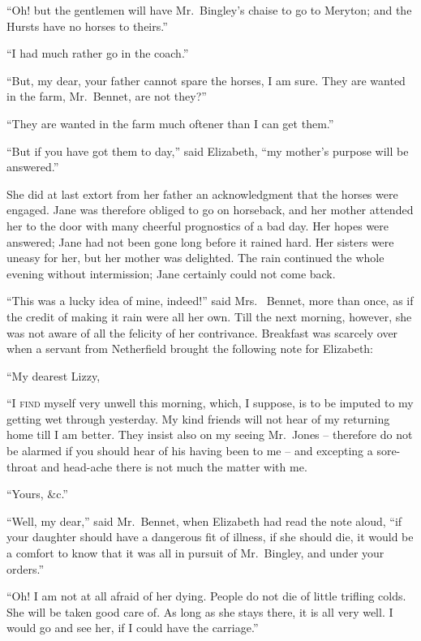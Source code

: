 “Oh! but the gentlemen will have Mr.\ Bingley’s chaise
to go to Meryton; and the Hursts have no horses to
theirs.”

“I had much rather go in the coach.”

“But, my dear, your father cannot spare the horses,
I am sure. They are wanted in the farm, Mr.\ Bennet,
are not they?”

“They are wanted in the farm much oftener than I can
get them.”

“But if you have got them to day,” said Elizabeth,
“my mother’s purpose will be answered.”

She did at last extort from her father an acknowledgment
that the horses were engaged. Jane was therefore
obliged to go on horseback, and her mother attended her
to the door with many cheerful prognostics of a bad day.
Her hopes were answered; Jane had not been gone long
before it rained hard. Her sisters were uneasy for her, but
her mother was delighted. The rain continued the whole
evening without intermission; Jane certainly could not
come back.

“This was a lucky idea of mine, indeed!” said Mrs.\ %
Bennet, more than once, as if the credit of making it rain
were all her own. Till the next morning, however, she
was not aware of all the felicity of her contrivance. Breakfast
was scarcely over when a servant from Netherfield
brought the following note for Elizabeth:

\begin{letter}
“My dearest Lizzy,

“I \textsc{find} myself very unwell this morning, which,
I suppose, is to be imputed to my getting wet through
yesterday. My kind friends will not hear of my returning
home till I am better. They insist also on my seeing
Mr.\ Jones -- therefore do not be alarmed if you should
hear of his having been to me -- and excepting a sore-%
throat and head-ache there is not much the matter with
me.

\raggedleft “Yours, \&c.”
\end{letter}

“Well, my dear,” said Mr.\ Bennet, when Elizabeth had
read the note aloud, “if your daughter should have a
dangerous fit of illness, if she should die, it would be
a comfort to know that it was all in pursuit of Mr.\ Bingley,
and under your orders.”

“Oh! I am not at all afraid of her dying. People
do not die of little trifling colds. She will be taken good
care of. As long as she stays there, it is all very well.
I would go and see her, if I could have the carriage.”

